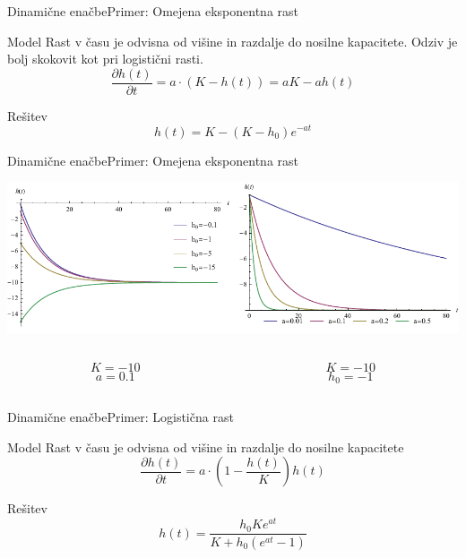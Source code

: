 \documentclass{beamer}
\begin{document}
\begin{frame}{Dinamične enačbe}{Primer: Omejena eksponentna rast}
\begin{block}{Model}
  Rast v času je odvisna od višine in razdalje do nosilne kapacitete. Odziv je bolj skokovit kot pri logistični rasti.
  \begin{equation} \frac{\partial h(t)}{\partial t} = a \cdot ( K - h(t) ) = a K - a h(t) \end{equation}
\end{block}
\begin{block}{Rešitev}
  \begin{equation} h(t) = K - (K - h_0) e^{-a t} \end{equation}
\end{block}
\end{frame}

\begin{frame}{Dinamične enačbe}{Primer: Omejena eksponentna rast}
\begin{center}
  \hspace*{-0.09\textwidth}\includegraphics[width=1.2\textwidth]{slike/omejena-eksponentna-rast}
  \footnotesize
\begin{columns}
  \begin{column}{0.5\textwidth}
  \[ K = -10 \]
  \[ a = 0.1 \]
  \end{column}
  \begin{column}{0.5\textwidth}
  \[ K = -10 \]
  \[ h_0 =-1 \]
  \end{column}
\end{columns}
\end{center}
\end{frame}


\begin{frame}{Dinamične enačbe}{Primer: Logistična rast}
\begin{block}{Model}
  Rast v času je odvisna od višine in razdalje do nosilne kapacitete
  \begin{equation} \frac{\partial h(t)}{\partial t} = a \cdot \left( 1 - \frac{h(t)}{K} \right) h(t) \end{equation}
\end{block}
\begin{block}{Rešitev}
  \begin{equation} h(t) = \frac{h_0 K e^{a t}}{K + h_0 (e^{a t}-1)} \end{equation}
\end{block}
\end{frame}
\end{document}
